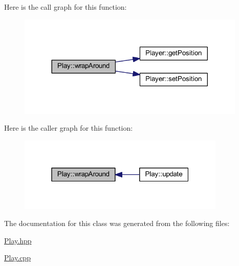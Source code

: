 Here is the call graph for this function\+:
\nopagebreak
\begin{figure}[H]
\begin{center}
\leavevmode
\includegraphics[width=308pt]{class_play_adaec4a516b2e9317d01d6c7fc255e7ee_cgraph}
\end{center}
\end{figure}
Here is the caller graph for this function\+:
\nopagebreak
\begin{figure}[H]
\begin{center}
\leavevmode
\includegraphics[width=280pt]{class_play_adaec4a516b2e9317d01d6c7fc255e7ee_icgraph}
\end{center}
\end{figure}


The documentation for this class was generated from the following files\+:\begin{DoxyCompactItemize}
\item 
\hyperlink{_play_8hpp}{Play.\+hpp}\item 
\hyperlink{_play_8cpp}{Play.\+cpp}\end{DoxyCompactItemize}

